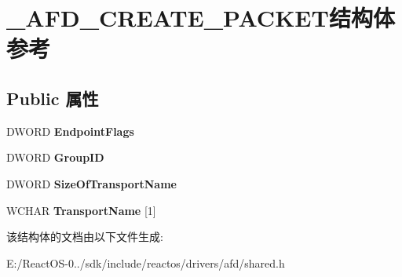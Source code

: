 \hypertarget{struct___a_f_d___c_r_e_a_t_e___p_a_c_k_e_t}{}\section{\+\_\+\+A\+F\+D\+\_\+\+C\+R\+E\+A\+T\+E\+\_\+\+P\+A\+C\+K\+E\+T结构体 参考}
\label{struct___a_f_d___c_r_e_a_t_e___p_a_c_k_e_t}
\subsection*{Public 属性}
\begin{DoxyCompactItemize}
\item 
\mbox{\label{struct___a_f_d___c_r_e_a_t_e___p_a_c_k_e_t_a2ff7dd77043c3ea110a210a8c9d99a30}} 
D\+W\+O\+RD {\bfseries Endpoint\+Flags}
\item 
\mbox{\label{struct___a_f_d___c_r_e_a_t_e___p_a_c_k_e_t_a6a195d4e79fce654b2562f893f6192c8}} 
D\+W\+O\+RD {\bfseries Group\+ID}
\item 
\mbox{\label{struct___a_f_d___c_r_e_a_t_e___p_a_c_k_e_t_ab8b8713f3dae1872081fa02f7d24553d}} 
D\+W\+O\+RD {\bfseries Size\+Of\+Transport\+Name}
\item 
\mbox{\label{struct___a_f_d___c_r_e_a_t_e___p_a_c_k_e_t_ab84e1e0cd2e279ca45e1a8f978251d7f}} 
W\+C\+H\+AR {\bfseries Transport\+Name} \mbox{[}1\mbox{]}
\end{DoxyCompactItemize}


该结构体的文档由以下文件生成\+:\begin{DoxyCompactItemize}
\item 
E\+:/\+React\+O\+S-\/0../sdk/include/reactos/drivers/afd/shared.\+h\end{DoxyCompactItemize}
